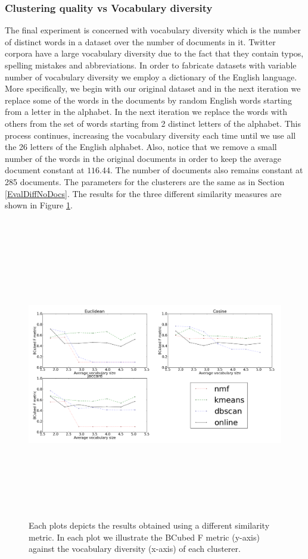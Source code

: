 \subsubsection{Clustering quality vs Vocabulary diversity}
The final experiment is concerned with vocabulary diversity which is the number of distinct words in a dataset over the number of documents in it. Twitter corpora have a large vocabulary diversity due to the fact that they contain typos, spelling mistakes and abbreviations. In order to fabricate datasets with variable number of vocabulary diversity we employ a dictionary of the English language. More specifically, we begin with our original dataset and in the next iteration we replace some of the words in the documents by random English words starting from a letter in the alphabet. In the next iteration we replace the words with others from the set of words starting from 2 distinct letters of the alphabet. This process continues, increasing the vocabulary diversity each time until we use all the 26 letters of the English alphabet. Also, notice that we remove a small number of the words in the original documents in order to keep the average document constant at $116.44$. The number of documents also remains constant at 285 documents. The parameters for the clusterers are the same as in Section \ref{EvalDiffNoDocs}. The results for the three different similarity measures are shown in Figure \ref{DifferentVocabularyResults}.\\\\ 
\begin{figure}[htbp]
  \begin{center}
    \includegraphics[height=5in, width=6in]{vocabulary}
    \caption{Each plots depicts the results obtained using a different similarity metric. In each plot we illustrate the BCubed F metric (y-axis) against the vocabulary diversity (x-axis) of each clusterer.}
    \label{DifferentVocabularyResults}
  \end{center}
\end{figure}
